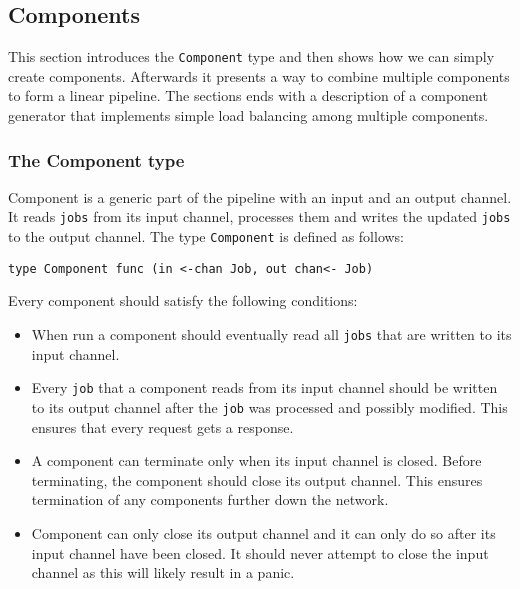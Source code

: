 \subsection{Components}
This section introduces the \texttt{Component} type and then shows how we can simply
create components. Afterwards it presents a way to combine multiple components
to form a linear pipeline. The sections ends with a description
of a component generator that implements simple load balancing among
multiple components.

\subsubsection{The Component type}
Component is a generic part of the pipeline with an input and 
an output channel. It reads \texttt{jobs} from its input channel, 
processes them and writes the updated \texttt{jobs} to the output 
channel. The type \texttt{Component} is defined as follows:
\begin{lstlisting}
type Component func (in <-chan Job, out chan<- Job)
\end{lstlisting}
Every component should satisfy the following conditions:
\begin{itemize}
    \item When run a component should eventually read all \texttt{jobs} that are
          written to its input channel.

    \item Every \texttt{job} that a component reads from its input channel
          should be written to its output channel after the \texttt{job} was processed
          and possibly modified. This ensures that every request gets a response.

    \item A component can terminate only when its input channel is closed. 
          Before terminating, the component should close its output channel.
          This ensures termination of any components further down the network.

    \item Component can only close its output channel and it can only do so
    	  after its input channel have been closed. It should never attempt
          to close the input channel as this will likely result in a panic.
\end{itemize}

